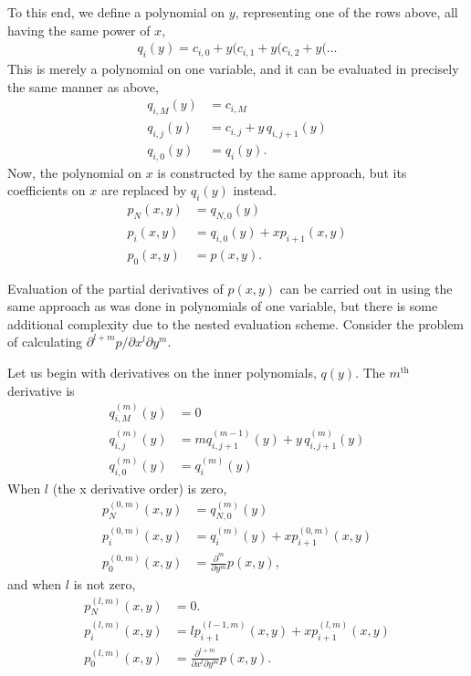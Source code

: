 \documentclass[letterpaper,11pt]{article}
\begin{document}
To this end, we define a polynomial on $y$, representing one of the rows above, all having the same power of $x$,
\begin{align}
q_i(y) = c_{i,0} + y ( c_{i,1} + y ( c_{i,2} + y ( \ldots
\end{align}
This is merely a polynomial on one variable, and it can be evaluated in precisely the same manner as above,
\begin{subequations}
\begin{align}
q_{i,M}(y) &= c_{i,M}\\
q_{i,j}(y) &= c_{i,j} + y\,q_{i,j+1}(y)\\
q_{i,0}(y) &= q_i(y).
\end{align}
\end{subequations}
Now, the polynomial on $x$ is constructed by the same approach, but its coefficients on $x$ are replaced by $q_i(y)$ instead.
\begin{subequations}
\begin{align}
p_N(x,y) &= q_{N,0}(y)\\
p_i(x,y) &= q_{i,0}(y) + x p_{i+1}(x,y)\\
p_0(x,y) &= p(x,y).
\end{align}
\end{subequations}

Evaluation of the partial derivatives of $p(x,y)$ can be carried out in using the same approach as was done in polynomials of one variable, but there is some additional complexity due to the nested evaluation scheme.  Consider the problem of calculating $\partial^{l+m} p / \partial x^l \partial y^m$.

Let us begin with derivatives on the inner polynomials, $q(y)$.  The $m^\mathrm{th}$ derivative is
\begin{subequations}
\begin{align}
q^{(m)}_{i,M}(y) &= 0\\
q^{(m)}_{i,j}(y) &= m q^{(m-1)}_{i,j+1}(y) + y\,q^{(m)}_{i,j+1}(y)\\
q^{(m)}_{i,0}(y) &= q^{(m)}_{i}(y)
\end{align}
\end{subequations}
When $l$ (the x derivative order) is zero,
\begin{align}
p^{(0,m)}_N(x,y) &= q^{(m)}_{N,0}(y)\\
p^{(0,m)}_i(x,y) &= q^{(m)}_{i}(y) + x p^{(0,m)}_{i+1}(x,y)\\
p^{(0,m)}_0(x,y) &= \frac{\partial^{m}}{\partial y^m}p(x,y),
\end{align}
and when $l$ is not zero,
\begin{align}
p^{(l,m)}_N(x,y) &= 0.\\
p^{(l,m)}_i(x,y) &= l p^{(l-1,m)}_{i+1}(x,y) + x p^{(l,m)}_{i+1}(x,y)\\
p^{(l,m)}_0(x,y) &= \frac{\partial^{l+m}}{\partial x^l \partial y^m}p(x,y).
\end{align}
\end{document}
